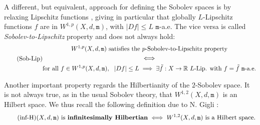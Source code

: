 \documentclass[10pt,leqno]{amsart}
\numberwithin{equation}{section}
\newcommand{\R}{\mathbb{R}}
\newcommand{\ttm}{\mathtt{m}}
\begin{document}
A different, but equivalent, approach for defining the Sobolev spaces is by relaxing Lipschitz functions \cite[Section 5.1]{AmIkLuPa24}, giving in particular that globally $L$-Lipschitz functions $f$ are in $W^{1,p}(X,d,\ttm)$, with $|Df|\leq L$ $\ttm$-a.e. The vice versa is called \textit{Sobolev-to-Lipschitz} property and does not always hold:
\begin{equation}\tag{Sob-Lip}\label{eq: p-sob to lip}
    \begin{gathered}
        W^{1,p}(X,d,\ttm) \text{ satisfies the $p$-Sobolev-to-Lipschitz property}
        \\
        \iff 
        \\
        \text{for all }f\in W^{1,p}(X,d,\ttm), \ \ |Df|\leq L \implies \exists \Tilde{f}:X \to \R \text{ $L$-Lip. with }f=\Tilde{f} \ \ttm\text{-a.e.}
    \end{gathered}
\end{equation}


Another important property regards the Hilbertianity of the $2$-Sobolev space. It is not always true, as in the usual Sobolev theory, that $W^{1,2}(X,d,\ttm)$ is an Hilbert space. We thus recall the following definition due to N. Gigli \cite{gigli2013splitting}:
\begin{equation}\label{inf-H}\tag{inf-H}
    (X,d,\ttm) \text{ is \textbf{infinitesimally Hilbertian}} \iff W^{1,2}(X,d,\ttm) \text{ is a Hilbert space}.
\end{equation}
\end{document}
